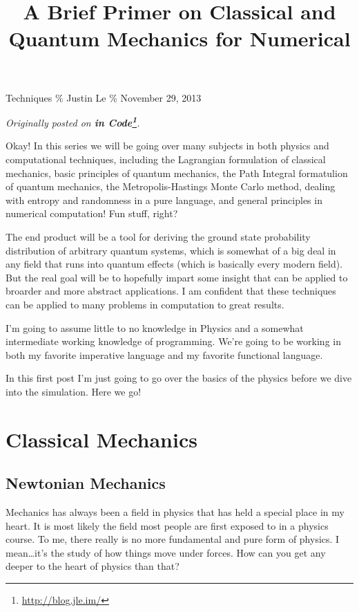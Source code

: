 \documentclass[]{article}
\title{A Brief Primer on Classical and Quantum Mechanics for Numerical}
\renewcommand{\href}[2]{#2\footnote{\url{#1}}}
\begin{document}
\maketitle

Techniques \% Justin Le \% November 29, 2013

\emph{Originally posted on \textbf{\href{http://blog.jle.im/}{in
Code}}.}

Okay! In this series we will be going over many subjects in both physics
and computational techniques, including the Lagrangian formulation of
classical mechanics, basic principles of quantum mechanics, the Path
Integral formatulion of quantum mechanics, the Metropolis-Hastings Monte
Carlo method, dealing with entropy and randomness in a pure language,
and general principles in numerical computation! Fun stuff, right?

The end product will be a tool for deriving the ground state probability
distribution of arbitrary quantum systems, which is somewhat of a big
deal in any field that runs into quantum effects (which is basically
every modern field). But the real goal will be to hopefully impart some
insight that can be applied to broarder and more abstract applications.
I am confident that these techniques can be applied to many problems in
computation to great results.

I'm going to assume little to no knowledge in Physics and a somewhat
intermediate working knowledge of programming. We're going to be working
in both my favorite imperative language and my favorite functional
language.

In this first post I'm just going to go over the basics of the physics
before we dive into the simulation. Here we go!

\section{Classical Mechanics}\label{classical-mechanics}

\subsection{Newtonian Mechanics}\label{newtonian-mechanics}

Mechanics has always been a field in physics that has held a special
place in my heart. It is most likely the field most people are first
exposed to in a physics course. To me, there really is no more
fundamental and pure form of physics. I mean\ldots{}it's the study of
how things move under forces. How can you get any deeper to the heart of
physics than that?
\end{document}
